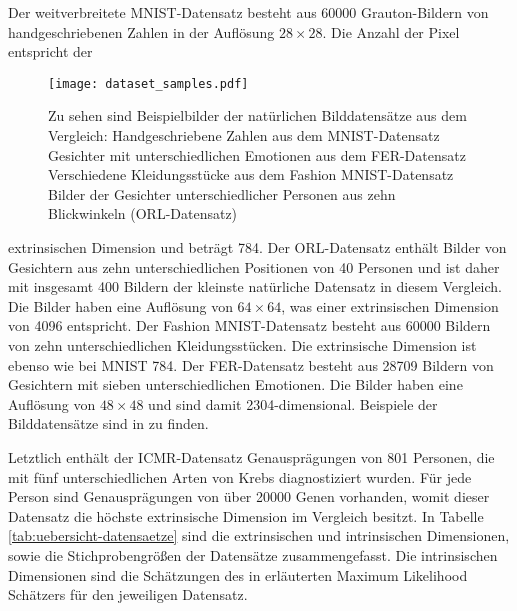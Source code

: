 Der weitverbreitete MNIST-Datensatz besteht aus \num{60000} Grauton-Bildern von handgeschriebenen
Zahlen in der Auflösung $28 \times 28$. Die Anzahl der Pixel entspricht der
\begin{figure}[ht]
	\begin{center}
		\texttt{[image: dataset\_samples.pdf]}
	\end{center}
	\caption[Beispielbilder der natürlichen Datensätze]{Zu sehen sind Beispielbilder der natürlichen Bilddatensätze aus dem Vergleich: \captiona Handgeschriebene Zahlen aus dem MNIST-Datensatz \captionb Gesichter mit unterschiedlichen Emotionen aus dem FER-Datensatz \captionc Verschiedene Kleidungsstücke aus dem Fashion MNIST-Datensatz \captiond Bilder der Gesichter unterschiedlicher Personen aus zehn Blickwinkeln (ORL-Datensatz)}
	\label{fig:Dataset_samples}
\end{figure}
extrinsischen Dimension und beträgt 784. Der ORL-Datensatz enthält Bilder von Gesichtern aus
zehn unterschiedlichen Positionen von 40 Personen und ist daher mit insgesamt 400 Bildern der kleinste natürliche Datensatz
in diesem Vergleich. Die Bilder haben eine Auflösung von $64 \times 64$, was einer
extrinsischen Dimension von \num{4096} entspricht. Der Fashion MNIST-Datensatz besteht aus \num{60000} Bildern
von zehn unterschiedlichen Kleidungsstücken. Die extrinsische Dimension ist ebenso wie bei MNIST
784. Der FER-Datensatz besteht aus \num{28 709} Bildern von Gesichtern mit sieben unterschiedlichen
Emotionen. Die Bilder haben eine Auflösung von $48 \times 48$ und sind damit \num{2304}-dimensional.
Beispiele der Bilddatensätze sind in  zu finden.


Letztlich enthält der ICMR-Datensatz Genausprägungen von 801 Personen, die mit fünf
unterschiedlichen Arten von Krebs diagnostiziert wurden. Für jede Person sind Genausprägungen von
über \num{20000} Genen vorhanden, womit dieser Datensatz die höchste extrinsische Dimension im
Vergleich besitzt. In Tabelle \ref{tab:uebersicht-datensaetze} sind die extrinsischen und
intrinsischen Dimensionen, sowie die Stichprobengrößen der Datensätze zusammengefasst. Die
intrinsischen Dimensionen sind die Schätzungen des in
 erläuterten Maximum
Likelihood Schätzers für den jeweiligen Datensatz.

